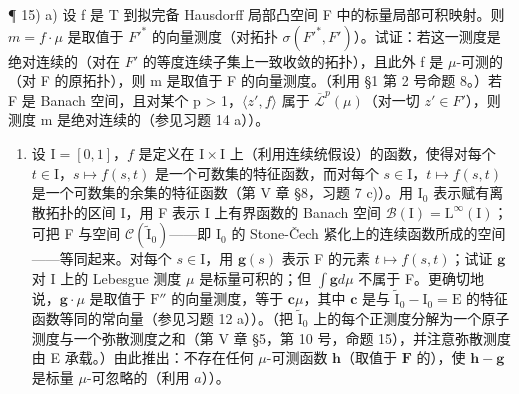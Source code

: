 ¶ 15) a) 设 f 是 T 到拟完备 Hausdorff 局部凸空间 F 中的标量局部可积映射。则 \(m = f \cdot \mu\) 是取值于 \(F'^{*}\) 的向量测度（对拓扑 \(\sigma(F'^{*}, F')\)）。试证：若这一测度是绝对连续的（对在 \(F'\) 的等度连续子集上一致收敛的拓扑），且此外 f 是 \(\mu\)-可测的（对 F 的原拓扑），则 m 是取值于 F 的向量测度。（利用 §1 第 2 号命题 8。）若 F 是 Banach 空间，且对某个 p \textgreater{} 1，\(\langle z', f \rangle\) 属于 \(\overline{\mathcal{L}}^{p}(\mu)\)（对一切 \(z' \in F'\)），则测度 m 是绝对连续的（参见习题 14 a））。

\begin{enumerate}
\def\labelenumi{\alph{enumi})}
\setcounter{enumi}{1}
\tightlist
\item
  设 \(\mathrm{I} = [0,1]\)，\(f\) 是定义在 \(\mathrm{I} \times \mathrm{I}\) 上（利用连续统假设）的函数，使得对每个 \(t \in \mathrm{I}\)，\(s \mapsto f(s,t)\) 是一个可数集的特征函数，而对每个 \(s \in \mathrm{I}\)，\(t \mapsto f(s,t)\) 是一个可数集的余集的特征函数（第 V 章 §8，习题 7 c)）。用 \(\mathrm{I}_0\) 表示赋有离散拓扑的区间 I，用 F 表示 I 上有界函数的 Banach 空间 \(\mathcal{B}(\mathrm{I}) = \mathrm{L}^\infty(\mathrm{I})\)；可把 F 与空间 \(\mathcal{C}(\widetilde{\mathrm{I}}_0)\)——即 \(\mathrm{I}_0\) 的 Stone-Čech 紧化上的连续函数所成的空间——等同起来。对每个 \(s \in \mathrm{I}\)，用 \(\mathbf{g}(s)\) 表示 F 的元素 \(t \mapsto f(s,t)\)；试证 \(\mathbf{g}\) 对 I 上的 Lebesgue 测度 \(\mu\) 是标量可积的；但 \(\int \mathbf{g} d\mu\) 不属于 F。更确切地说，\(\mathbf{g} \cdot \mu\) 是取值于 \(\mathrm{F}''\) 的向量测度，等于 \(\mathbf{c}\mu\)，其中 \(\mathbf{c}\) 是与 \(\widetilde{\mathrm{I}}_0 - \mathrm{I}_0 = \mathrm{E}\) 的特征函数等同的常向量（参见习题 12 a））。（把 \(\widetilde{\mathrm{I}}_0\) 上的每个正测度分解为一个原子测度与一个弥散测度之和（第 V 章 §5，第 10 号，命题 15），并注意弥散测度由 E 承载。）由此推出：不存在任何 \(\mu\)-可测函数 \(\mathbf{h}\)（取值于 \(\mathbf{F}\) 的），使 \(\mathbf{h} - \mathbf{g}\) 是标量 \(\mu\)-可忽略的（利用 \(a\)））。
\end{enumerate}

